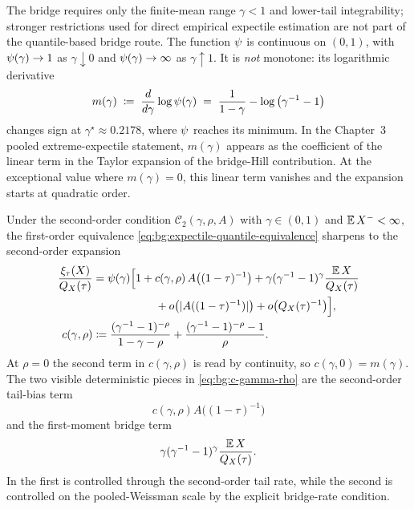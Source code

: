 The bridge requires only the finite-mean range $\gamma<1$ and lower-tail
integrability; stronger restrictions used for direct empirical
expectile estimation are not part of the quantile-based bridge route.
The function $\psi$ is continuous
on $(0,1)$, with
$\psi(\gamma) \to 1$ as $\gamma \downarrow 0$ and
$\psi(\gamma) \to \infty$ as $\gamma \uparrow 1$. It is \emph{not}
monotone: its logarithmic derivative
\begin{equation}
\label{eq:bg:m-function}
  m(\gamma)
  \;\coloneqq\;
  \frac{d}{d\gamma}\log\psi(\gamma)
  \;=\;
  \frac{1}{1 - \gamma} - \log\big(\gamma^{-1} - 1\big)
\end{equation}
changes sign at $\gamma^{\star}\approx0.2178$, where $\psi$ reaches
its minimum. In the Chapter~3 pooled extreme-expectile statement, $m(\gamma)$
appears as the coefficient of the linear term in the Taylor expansion of the
bridge-Hill contribution. At the exceptional value where $m(\gamma)=0$, this
linear term vanishes and the expansion starts at quadratic order.

Under the second-order condition $\mathcal C_{2}(\gamma, \rho, A)$ with
$\gamma \in (0, 1)$ and $\operatorname{\mathbb{E}} X^{-}<\infty$, the first-order equivalence
\eqref{eq:bg:expectile-quantile-equivalence} sharpens to the
second-order expansion
\parencite[Proposition~1(i)]{DaouiaGirardStupfler2020}
\begin{equation}
\label{eq:bg:c-gamma-rho}
  \begin{aligned}
  \frac{\xi_{\tau}(X)}{Q_{X}(\tau)}
  &=
  \psi(\gamma)\Big[
      1 + c(\gamma, \rho)\,A\big((1 - \tau)^{-1}\big)
      + \gamma(\gamma^{-1} - 1)^{\gamma}
        \frac{\operatorname{\mathbb{E}} X}{Q_{X}(\tau)}
  \\
  &\hspace{5.6em}
      + o\big(\lvert A((1 - \tau)^{-1})\rvert\big)
      + o\big(Q_{X}(\tau)^{-1}\big)
    \Big],
  \\
  c(\gamma, \rho)
  &\coloneqq
  \frac{(\gamma^{-1} - 1)^{-\rho}}{1 - \gamma - \rho}
  + \frac{(\gamma^{-1} - 1)^{-\rho} - 1}{\rho}.
  \end{aligned}
\end{equation}
At $\rho=0$ the second term in $c(\gamma,\rho)$ is read by continuity,
so $c(\gamma,0)=m(\gamma)$. The two visible deterministic pieces in
\eqref{eq:bg:c-gamma-rho} are the second-order tail-bias term
\[
  c(\gamma,\rho)A\big((1-\tau)^{-1}\big)
\]
and the first-moment bridge term
\[
  \gamma(\gamma^{-1}-1)^\gamma
  \frac{\operatorname{\mathbb{E}} X}{Q_X(\tau)}.
\]
In  the first is controlled through the
second-order tail rate, while the second is controlled on the
pooled-Weissman scale by the explicit bridge-rate condition.


